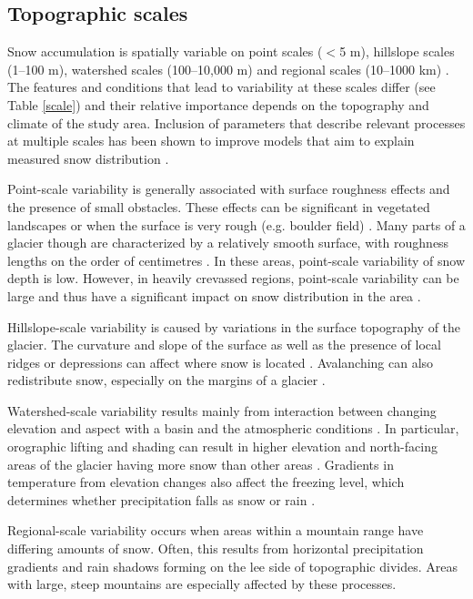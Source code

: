 \documentclass{sfuthesis}
\begin{document}
\subsection{Topographic scales}
Snow accumulation is spatially variable on point scales ($<$5 m), hillslope scales (1--100 m), watershed scales (100--10,000 m) and regional scales (10--1000 km) \citep{Clark2011}. The features and conditions that lead to variability at these scales differ (see Table \ref{scale}) and their relative importance depends on the topography and climate of the study area. Inclusion of parameters that describe relevant processes at multiple scales has been shown to improve models that aim to explain measured snow distribution \citep{Marchand2005, Clark2011}. 

Point-scale variability is generally associated with surface roughness effects and the presence of small obstacles. These effects can be significant in vegetated landscapes or when the surface is very rough (e.g. boulder field) \citep{Lopez2011}. Many parts of a glacier though are characterized by a relatively smooth surface, with roughness lengths on the order of centimetres \citep{Hock2005}. In these areas, point-scale variability of snow depth is low. However, in heavily crevassed regions, point-scale variability can be large and thus have a significant impact on snow distribution in the area \citep{McGrath2015}. 

Hillslope-scale variability is caused by variations in the surface topography of the glacier. The curvature and slope of the surface as well as the presence of local ridges or depressions can affect where snow is located \citep{Bloeschl1999, Sold2013}. Avalanching can also redistribute snow, especially on the margins of a glacier \citep{Bloschl1991, Mott2008}. 

Watershed-scale variability results mainly from interaction between changing elevation and aspect with a basin and the atmospheric conditions \citep{Clark2011}. In particular, orographic lifting and shading can result in higher elevation and north-facing areas of the glacier having more snow than other areas \citep{Mott2008, Sold2013}. Gradients in temperature from elevation changes also affect the freezing level, which determines whether precipitation falls as snow or rain \citep{Bloschl1991}. 

Regional-scale variability occurs when areas within a mountain range have differing amounts of snow. Often, this results from horizontal precipitation gradients and rain shadows forming on the lee side of topographic divides. Areas with large, steep mountains are especially affected by these processes.
\end{document}
